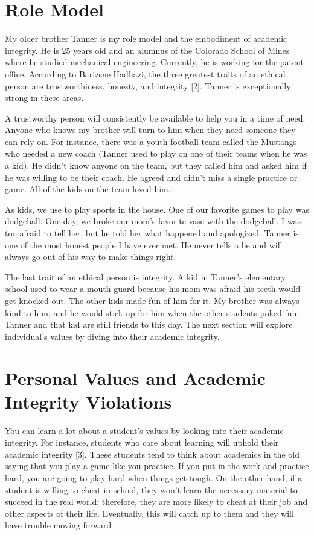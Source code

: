 \documentclass[11pt]{article}
\begin{document}
\section{Role Model}

My older brother Tanner is my role model and the embodiment of academic integrity. He is 25 years old and an alumnus of the Colorado School of Mines where he studied mechanical engineering. Currently, he is working for the patent office. According to Barizsne Hadhazi, the three greatest traits of an ethical person are trustworthiness, honesty, and integrity [2]. Tanner is exceptionally strong in these areas. 

A trustworthy person will consistently be available to help you in a time of need. Anyone who knows my brother will turn to him when they need someone they can rely on. For instance, there was a youth football team called the Mustangs who needed a new coach (Tanner used to play on one of their teams when he was a kid). He didn’t know anyone on the team, but they called him and asked him if he was willing to be their coach. He agreed and didn’t miss a single practice or game. All of the kids on the team loved him.  

As kids, we use to play sports in the house. One of our favorite games to play was dodgeball. One day, we broke our mom's favorite vase with the dodgeball. I was too afraid to tell her, but he told her what happened and apologized. Tanner is one of the most honest people I have ever met. He never tells a lie and will always go out of his way to make things right. 

The last trait of an ethical person is integrity. A kid in Tanner’s elementary school used to wear a mouth guard because his mom was afraid his teeth would get knocked out. The other kids made fun of him for it. My brother was always kind to him, and he would stick up for him when the other students poked fun. Tanner and that kid are still friends to this day. The next section will explore individual's values by diving into their academic integrity. 

\section{Personal Values and Academic Integrity Violations}
You can learn a lot about a student's values by looking into their academic integrity. For instance, students who care about learning will uphold their academic integrity [3]. These students tend to think about academics in the old saying that you play a game like you practice. If you put in the work and practice hard, you are going to play hard when things get tough. On the other hand, if a student is willing to cheat in school, they won’t learn the necessary material to succeed in the real world; therefore, they are more likely to cheat at their job and other aspects of their life. Eventually, this will catch up to them and they will have trouble moving forward  
\end{document}
